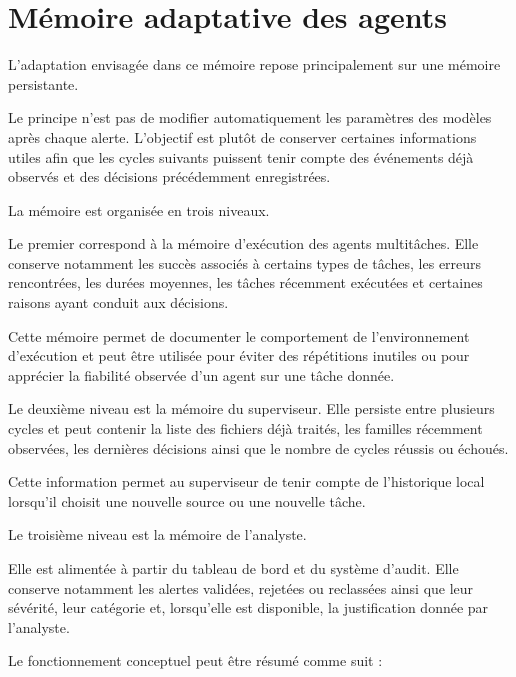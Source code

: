 \section{Mémoire adaptative des agents}

L'adaptation envisagée dans ce mémoire repose principalement sur une mémoire persistante.

Le principe n'est pas de modifier automatiquement les paramètres des modèles après chaque alerte. L'objectif est plutôt de conserver certaines informations utiles afin que les cycles suivants puissent tenir compte des événements déjà observés et des décisions précédemment enregistrées.

La mémoire est organisée en trois niveaux.

Le premier correspond à la mémoire d'exécution des agents multitâches. Elle conserve notamment les succès associés à certains types de tâches, les erreurs rencontrées, les durées moyennes, les tâches récemment exécutées et certaines raisons ayant conduit aux décisions.

Cette mémoire permet de documenter le comportement de l'environnement d'exécution et peut être utilisée pour éviter des répétitions inutiles ou pour apprécier la fiabilité observée d'un agent sur une tâche donnée.

Le deuxième niveau est la mémoire du superviseur. Elle persiste entre plusieurs cycles et peut contenir la liste des fichiers déjà traités, les familles récemment observées, les dernières décisions ainsi que le nombre de cycles réussis ou échoués.

Cette information permet au superviseur de tenir compte de l'historique local lorsqu'il choisit une nouvelle source ou une nouvelle tâche.

Le troisième niveau est la mémoire de l'analyste.

Elle est alimentée à partir du tableau de bord et du système d'audit. Elle conserve notamment les alertes validées, rejetées ou reclassées ainsi que leur sévérité, leur catégorie et, lorsqu'elle est disponible, la justification donnée par l'analyste.

Le fonctionnement conceptuel peut être résumé comme suit :


